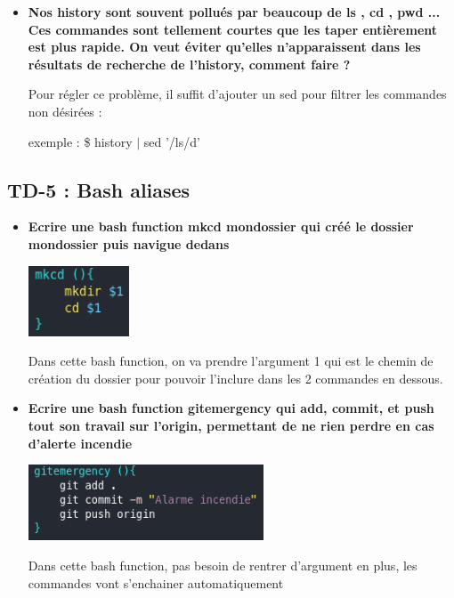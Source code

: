 \documentclass[12pt]{article}
\begin{document}
\begin{itemize}
  \item \textbf{Nos history sont souvent pollués par beaucoup de ls , cd , pwd ...
  Ces commandes sont tellement courtes que les taper entièrement est plus rapide.
  On veut éviter qu'elles n'apparaissent dans les résultats de recherche de
  l'history, comment faire ?}
  \vspace{0.3cm}

  Pour régler ce problème, il suffit d'ajouter un sed pour filtrer les commandes non désirées : \newline

  exemple : \$ history $|$ sed '/ls/d'

\end{itemize}

  \subsection{TD-5 : Bash aliases}
\vspace{0.3cm}

\begin{itemize}
  \item \textbf{Ecrire une bash function mkcd mondossier qui créé le dossier mondossier
  puis navigue dedans}
  \vspace{0.3cm}

  \includegraphics[width=3cm]{screen-mkcd-td5.png}
  \vspace{0.3cm}

  Dans cette bash function, on va prendre l'argument 1 qui est le chemin de création du dossier pour pouvoir
  l'inclure dans les 2 commandes en dessous.

\end{itemize}

\vspace{0.3cm}

\begin{itemize}
  \item \textbf{Ecrire une bash function gitemergency qui add, commit, et push tout son
  travail sur l'origin, permettant de ne rien perdre en cas d'alerte incendie}
  \vspace{0.3cm}

  \includegraphics[width=7cm]{screen-gitemergency-td5.png}
  \vspace{0.3cm}

  Dans cette bash function, pas besoin de rentrer d'argument en plus, les commandes vont s'enchainer automatiquement
\end{itemize}
\end{document}
